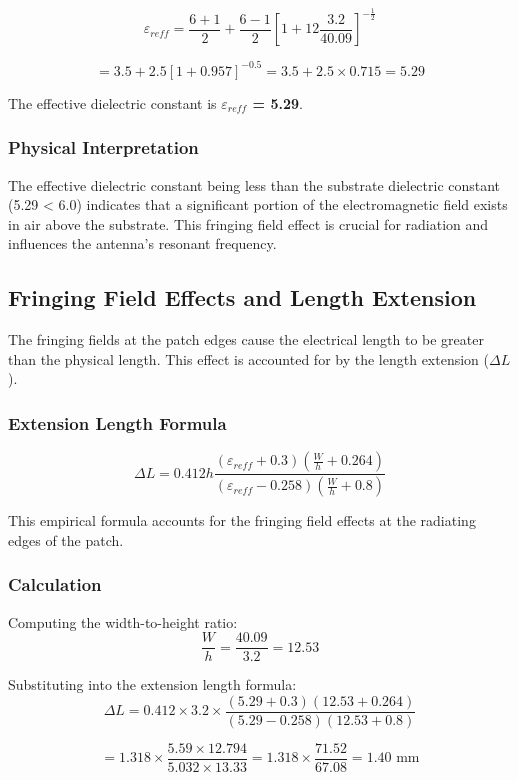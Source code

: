 \documentclass[12pt]{article}
\begin{document}
\[\varepsilon_{reff} = \frac{6 + 1}{2} + \frac{6 - 1}{2}\left[1 + 12\frac{3.2}{40.09}\right]^{-\frac{1}{2}}\]

\[= 3.5 + 2.5\left[1 + 0.957\right]^{-0.5} = 3.5 + 2.5 \times 0.715 = 5.29\]

The effective dielectric constant is \textbf{$\varepsilon_{reff}$ = 5.29}.

\subsubsection{Physical Interpretation}

The effective dielectric constant being less than the substrate dielectric constant (5.29 < 6.0) indicates that a significant portion of the electromagnetic field exists in air above the substrate. This fringing field effect is crucial for radiation and influences the antenna's resonant frequency.

\subsection{Fringing Field Effects and Length Extension}

The fringing fields at the patch edges cause the electrical length to be greater than the physical length. This effect is accounted for by the length extension ($\Delta L$).

\subsubsection{Extension Length Formula}

\[\Delta L = 0.412h\frac{(\varepsilon_{reff} + 0.3)\left(\frac{W}{h} + 0.264\right)}{(\varepsilon_{reff} - 0.258)\left(\frac{W}{h} + 0.8\right)}\]

This empirical formula accounts for the fringing field effects at the radiating edges of the patch.

\subsubsection{Calculation}

Computing the width-to-height ratio:
\[\frac{W}{h} = \frac{40.09}{3.2} = 12.53\]

Substituting into the extension length formula:
\[\Delta L = 0.412 \times 3.2 \times \frac{(5.29 + 0.3)(12.53 + 0.264)}{(5.29 - 0.258)(12.53 + 0.8)}\]

\[= 1.318 \times \frac{5.59 \times 12.794}{5.032 \times 13.33} = 1.318 \times \frac{71.52}{67.08} = 1.40 \text{ mm}\]
\end{document}
